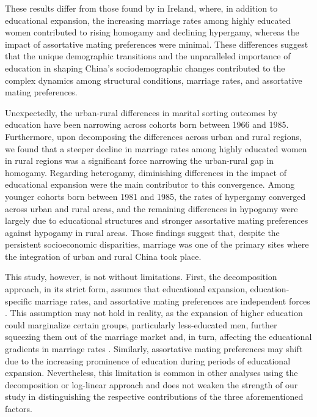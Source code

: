 These results differ from those found by \textcite{leeschDecomposingTrendsEducational2023} in Ireland, where, in addition to educational expansion, the increasing marriage rates among highly educated women contributed to rising homogamy and declining hypergamy, whereas the impact of assortative mating preferences were minimal. These differences suggest that the unique demographic transitions and the unparalleled importance of education in shaping China's sociodemographic changes contributed to the complex dynamics among structural conditions, marriage rates, and assortative mating preferences.

Unexpectedly, the urban-rural differences in marital sorting outcomes by education have been narrowing across cohorts born between 1966 and 1985. Furthermore, upon decomposing the differences across urban and rural regions, we found that a steeper decline in marriage rates among highly educated women in rural regions was a significant force narrowing the urban-rural gap in homogamy. Regarding heterogamy, diminishing differences in the impact of educational expansion were the main contributor to this convergence. Among younger cohorts born between 1981 and 1985, the rates of hypergamy converged across urban and rural areas, and the remaining differences in hypogamy were largely due to educational structures and stronger assortative mating preferences against hypogamy in rural areas. Those findings suggest that, despite the persistent socioeconomic disparities, marriage was one of the primary sites where the integration of urban and rural China took place.

This study, however, is not without limitations. First, the decomposition approach, in its strict form, assumes that educational expansion, education-specific marriage rates, and assortative mating preferences are independent forces \parencite{leeschDecomposingTrendsEducational2023}. This assumption may not hold in reality, as the expansion of higher education could marginalize certain groups, particularly less-educated men, further squeezing them out of the marriage market and, in turn, affecting the educational gradients in marriage rates \parencite{jiangMarriageSqueezeNeverMarried2014}. Similarly, assortative mating preferences may shift due to the increasing prominence of education during periods of educational expansion. Nevertheless, this limitation is common in other analyses using the decomposition or log-linear approach and does not weaken the strength of our study in distinguishing the respective contributions of the three aforementioned factors.

